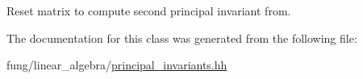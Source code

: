 Reset matrix to compute second principal invariant from. 



The documentation for this class was generated from the following file\-:\begin{DoxyCompactItemize}
\item 
fung/linear\-\_\-algebra/\hyperlink{principal__invariants_8hh}{principal\-\_\-invariants.\-hh}\end{DoxyCompactItemize}
